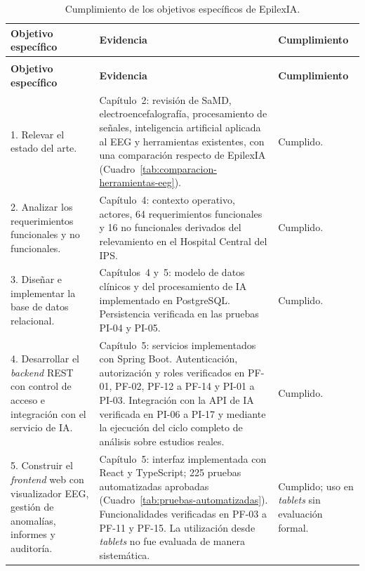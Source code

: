 \begin{longtable}{|
>{\raggedright\arraybackslash}p{}|
>{\raggedright\arraybackslash}p{}|
>{\raggedright\arraybackslash}p{}|}
\caption{Cumplimiento de los objetivos específicos de EpilexIA.}
\label{tab:cumplimiento-objetivos}\\
\hline
\textbf{Objetivo específico} &
\textbf{Evidencia} &
\textbf{Cumplimiento} \\
\hline
\endfirsthead

\multicolumn{3}{c}{\textit{Continuación del Cuadro~\thetable}}\\
\hline
\textbf{Objetivo específico} &
\textbf{Evidencia} &
\textbf{Cumplimiento} \\
\hline
\endhead

1. Relevar el estado del arte. &
Capítulo~2: revisión de SaMD, electroencefalografía, procesamiento de señales, inteligencia artificial aplicada al EEG y herramientas existentes, con una comparación respecto de EpilexIA (Cuadro~\ref{tab:comparacion-herramientas-eeg}). &
Cumplido. \\
\hline

2. Analizar los requerimientos funcionales y no funcionales. &
Capítulo~4: contexto operativo, actores, 64 requerimientos funcionales y 16 no funcionales derivados del relevamiento en el Hospital Central del IPS. &
Cumplido. \\
\hline

3. Diseñar e implementar la base de datos relacional. &
Capítulos~4 y~5: modelo de datos clínicos y del procesamiento de IA implementado en PostgreSQL.
Persistencia verificada en las pruebas PI-04 y PI-05. &
Cumplido. \\
\hline

4. Desarrollar el \textit{backend} REST con control de acceso e integración con el servicio de IA. &
Capítulo~5: servicios implementados con Spring Boot.
Autenticación, autorización y roles verificados en PF-01, PF-02, PF-12 a PF-14 y PI-01 a PI-03.
Integración con la API de IA verificada en PI-06 a PI-17 y mediante la ejecución del ciclo completo de análisis sobre estudios reales. &
Cumplido. \\
\hline

5. Construir el \textit{frontend} web con visualizador EEG, gestión de anomalías, informes y auditoría. &
Capítulo~5: interfaz implementada con React y TypeScript; 225 pruebas automatizadas aprobadas (Cuadro~\ref{tab:pruebas-automatizadas}).
Funcionalidades verificadas en PF-03 a PF-11 y PF-15.
La utilización desde \textit{tablets} no fue evaluada de manera sistemática. &
Cumplido; uso en \textit{tablets} sin evaluación formal. \\
\hline


\end{longtable}
